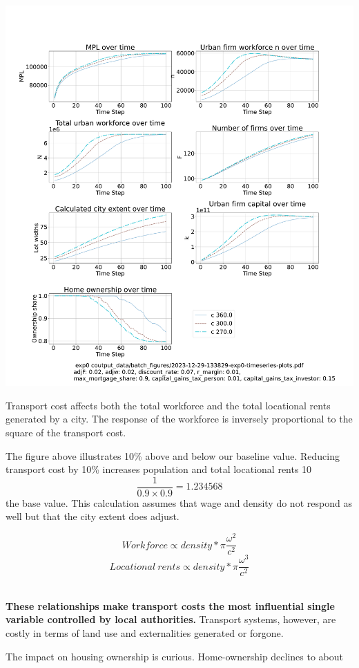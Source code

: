 \documentclass{article}
\begin{document}
 \hspace{-2.5cm}\includegraphics[trim= 1.5cm 3.65cm 2cm 4.0cm, clip, scale=.28]{fig/Analysis/Changing_Transport-cost2.pdf}

Transport cost affects both the total workforce and the total locational rents generated by a city. The response of the workforce is inversely proportional to the square of the transport cost.  

The figure above illustrates 10\% above and below our baseline value.  Reducing transport cost by 10\% increases population and total locational rents 10 \[\frac{1}{0.9 \times 0.9}=1.234568\]
the base value. This calculation assumes that wage and density do not respond as well but that the city extent does adjust.

\[Workforce\propto density * \pi \frac{\omega^2}{c^2}\]
\[Locational\ rents\propto density * \pi \frac{\omega^3}{c^2}\]\

\textbf{These relationships make transport costs the most influential single variable controlled by local authorities.} Transport systems, however, are costly in terms of land use and externalities generated or forgone.

The impact on housing ownership is curious. Home-ownership declines to about 
\end{document}
